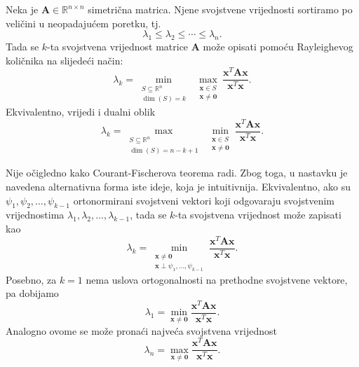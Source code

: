  \begin{theorem}\label{thm:courant-fischer}
   Neka je \(\mathbf{A}\in\mathbb{R}^{n\times n}\) simetrična matrica. Njene
   svojstvene vrijednosti sortiramo po veličini u neopadajućem poretku, tj.
   \[
       \lambda_1 \leq \lambda_2 \leq \cdots \leq \lambda_n.
   \]
   Tada se \(k\)-ta svojstvena vrijednost matrice \(\mathbf{A}\) može opisati
   pomoću Rayleighevog količnika \cite{spielman2025spectral} na slijedeći način:
   \begin{equation}\label{courant:minmax}
       \lambda_k
       =
       \min_{\substack{S\subseteq \mathbb{R}^n\\ \dim(S)=k}}
       \;
       \max_{\substack{\mathbf{x}\in S\\ \mathbf{x}\neq \mathbf{0}}}
       \frac{\mathbf{x}^T\mathbf{A}\mathbf{x}}{\mathbf{x}^T\mathbf{x}}.
   \end{equation}
   Ekvivalentno, vrijedi i dualni oblik
   \begin{equation}\label{courant:maxmin}
       \lambda_k
       =
       \max_{\substack{S\subseteq \mathbb{R}^n\\ \dim(S)=n-k+1}}
       \;
       \min_{\substack{\mathbf{x}\in S\\ \mathbf{x}\neq \mathbf{0}}}
       \frac{\mathbf{x}^T\mathbf{A}\mathbf{x}}{\mathbf{x}^T\mathbf{x}}.
   \end{equation}

    Nije očigledno kako Courant-Fischerova teorema radi. Zbog toga, u nastavku je navedena alternativna forma iste ideje, koja je intuitivnija. Ekvivalentno, ako su
    \(\psi_1,\psi_2,\ldots,\psi_{k-1}\)
    ortonormirani svojstveni vektori koji odgovaraju svojstvenim vrijednostima
   \(\lambda_1,\lambda_2,\ldots,\lambda_{k-1}\), tada se \(k\)-ta svojstvena
   vrijednost može zapisati kao
   \begin{equation}\label{courant:ortogonalno}
       \lambda_k
       =
       \min_{\substack{\mathbf{x}\neq \mathbf{0}\\
        \mathbf{x}\perp \psi_1,\ldots,\psi_{k-1}}}
       \frac{\mathbf{x}^T\mathbf{A}\mathbf{x}}{\mathbf{x}^T\mathbf{x}}.
   \end{equation}
    Posebno, za \(k=1\) nema uslova ortogonalnosti na prethodne svojstvene
      vektore, pa dobijamo
      \begin{equation}\label{courant:najmanja-lambda}
          \lambda_1
          =
          \min_{\mathbf{x}\neq \mathbf{0}}
          \frac{\mathbf{x}^T\mathbf{A}\mathbf{x}}{\mathbf{x}^T\mathbf{x}}.
      \end{equation}
      Analogno ovome se može pronaći najveća svojstvena vrijednost
      \begin{equation}\label{courant:najveca-lambda}
          \lambda_n
          =
          \max_{\mathbf{x}\neq \mathbf{0}}
          \frac{\mathbf{x}^T\mathbf{A}\mathbf{x}}{\mathbf{x}^T\mathbf{x}}.
      \end{equation}
   \end{theorem}

